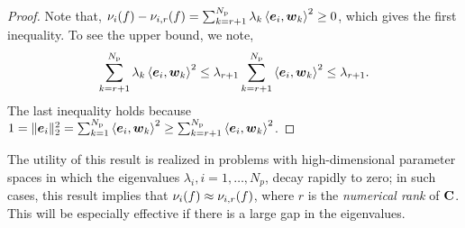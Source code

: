 \begin{proof} 


Note that, $\nu_i(f) - \act{f}{i}{r}= \sum_{k=r+1}^\Np \lambda_k \ip{\vec{e}_i}{\vec{w}_k}^2 \geq 0$,
which gives the first inequality. To see the upper bound, we note,
\[
   \sum_{k=r+1}^\Np \lambda_k \ip{\vec{e}_i}{\vec{w}_k}^2 \leq \lambda_{r+1} \sum_{k=r+1}^\Np \ip{\vec{e}_i}{\vec{w}_k}^2
   \leq \lambda_{r+1}. 
\]
The last inequality holds because 
$1 = \|\vec{e}_i\|_2^2 = 
\sum_{k = 1}^\Np \ip{\vec{e}_i}{\vec{w}_k}^2 
\geq \sum_{k=r+1}^\Np \ip{\vec{e}_i}{\vec{w}_k}^2$.
\end{proof} 
The utility of this result is realized in problems with 
high-dimensional parameter spaces in which 
the eigenvalues $\lambda_i, i=1,\ldots,N_p$, decay rapidly to zero; in 
such cases, this result implies that  $\nu_i(f) \approx \act{f}{i}{r}$,
where $r$ is the \emph{numerical rank} of $\mat{C}$.  This will be especially
effective if there is a large gap in the eigenvalues.  


